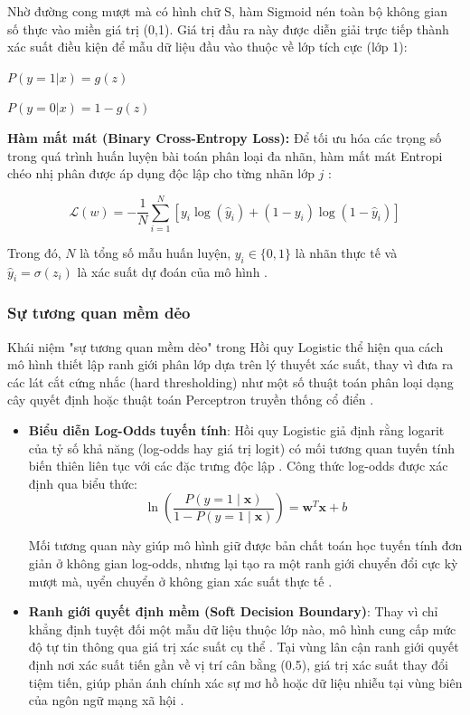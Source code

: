 Nhờ đường cong mượt mà có hình chữ S, hàm Sigmoid nén toàn bộ không gian số thực vào miền giá trị (0,1). Giá trị đầu ra này được diễn giải trực tiếp thành xác suất điều kiện để mẫu dữ liệu đầu vào thuộc về lớp tích cực (lớp 1):

$P(y = 1|x) = g(z)$

$P(y = 0|x) = 1 - g(z)$

\textbf{Hàm mất mát (Binary Cross-Entropy Loss):} Để tối ưu hóa các trọng số trong quá trình huấn luyện bài toán phân loại đa nhãn, hàm mất mát Entropi chéo nhị phân được áp dụng độc lập cho từng nhãn lớp $j$ \cite{hastie2009elements}:

$$
\mathcal{L}({w}) = -\frac{1}{N} \sum_{i=1}^{N} [y_i \log(\hat{y}_i) + (1 - y_i) \log(1 - \hat{y}_i)]
$$

Trong đó, $N$ là tổng số mẫu huấn luyện, $y_i \in \{0, 1\}$ là nhãn thực tế và $\hat{y}_i = \sigma(z_i)$ là xác suất dự đoán của mô hình \cite{hastie2009elements}.

\subsubsection{Sự tương quan mềm dẻo}

Khái niệm "sự tương quan mềm dẻo" trong Hồi quy Logistic thể hiện qua cách mô hình thiết lập ranh giới phân lớp dựa trên lý thuyết xác suất, thay vì đưa ra các lát cắt cứng nhắc (hard thresholding) như một số thuật toán phân loại dạng cây quyết định hoặc thuật toán Perceptron truyền thống cổ điển \cite{hastie2009elements}.
\begin{itemize}
\item \textbf{Biểu diễn Log-Odds tuyến tính}: Hồi quy Logistic giả định rằng logarit của tỷ số khả năng (log-odds hay giá trị logit) có mối tương quan tuyến tính biến thiên liên tục với các đặc trưng độc lập \cite{hastie2009elements}. Công thức log-odds được xác định qua biểu thức:
$$
\ln \left( \frac{P(y = 1 \mid \mathbf{x})}{1 - P(y = 1 \mid \mathbf{x})} \right) = \mathbf{w}^T \mathbf{x} + b
$$

Mối tương quan này giúp mô hình giữ được bản chất toán học tuyến tính đơn giản ở không gian log-odds, nhưng lại tạo ra một ranh giới chuyển đổi cực kỳ mượt mà, uyển chuyển ở không gian xác suất thực tế \cite{hastie2009elements}.

\item \textbf{Ranh giới quyết định mềm (Soft Decision Boundary)}: Thay vì chỉ khẳng định tuyệt đối một mẫu dữ liệu thuộc lớp nào, mô hình cung cấp mức độ tự tin thông qua giá trị xác suất cụ thể \cite{hastie2009elements}. Tại vùng lân cận ranh giới quyết định nơi xác suất tiến gần về vị trí cân bằng (0.5), giá trị xác suất thay đổi tiệm tiến, giúp phản ánh chính xác sự mơ hồ hoặc dữ liệu nhiễu tại vùng biên của ngôn ngữ mạng xã hội \cite{hastie2009elements}.
\end{itemize}

